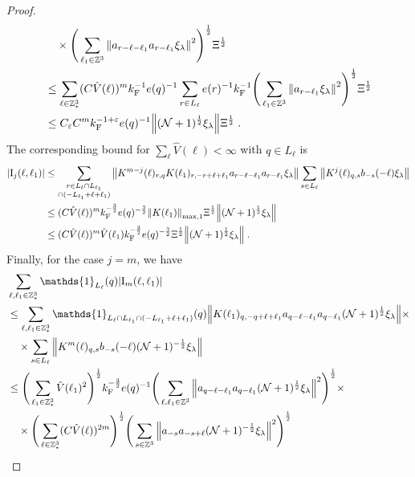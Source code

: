 \documentclass[12pt,a4paper]{article}
\numberwithin{equation}{section}
\newcommand{\1}{\mathbb{I}}
\newcommand{\F}{\mathrm{F}}
\newcommand{\I}{\mathrm{I}}
\newcommand{\Z}{\mathbb{Z}}
\newcommand{\NN}{\mathcal{N}}
\newcommand{\half}{\frac{1}{2}}
\theoremstyle{plain}
\theoremstyle{definition}
\theoremstyle{remark}
\theoremstyle{plain}
\theoremstyle{definition}
\theoremstyle{remark}
\begin{document}
\begin{proof}
\begin{align}
	&\quad \times \Bigg( \sum_{\ell_1 \in \Z^3} \norm{ a_{r-\ell-\ell_1} a_{r-\ell_1} \xi_\lambda}^2 \Bigg)^{\half}
		\Xi^\half \nonumber\\
	&\leq \sum_{\ell \in \Z^3_*} (C \hat{V}(\ell))^m k_{\F}^{-1} e(q)^{-1}
		\sum_{r \in L_\ell} e(r)^{-1} k_{\F}^{-1}
		\Bigg( \sum_{\ell_1 \in \Z^3} \norm{ a_{r-\ell_1} \xi_\lambda}^2 \Bigg)^{\half}
		\Xi^\half \nonumber\\
	&\leq C_\varepsilon C^m k_{\F}^{-1+\varepsilon} e(q)^{-1}
		\norm{ (\NN+1)^{\half} \xi_\lambda}
		\Xi^\half \;. \label{eq:estEQ2152_Coulomb}
\end{align}
The corresponding bound for $ \sum_\ell \hat{V}(\ell) < \infty $ with $ q \in L_\ell $ is
\begin{align}
	|\I_j(\ell, \ell_1)|
	&\leq \sum_{\substack{r\in L_{\ell} \cap L_{\ell_1}\\ \cap (-L_{\ell_1}+\ell+\ell_1)}}
		\norm{ K^{m-j}(\ell)_{r,q} K(\ell_1)_{r,-r+\ell+\ell_1} a_{r-\ell-\ell_1} a_{r-\ell_1} \xi_\lambda}
		\sum_{s \in L_{\ell}}
		\norm{ K^j(\ell)_{q,s} b_{-s}(-\ell) \xi_\lambda }\nonumber\\
	&\leq (C \hat{V}(\ell))^m k_{\F}^{-\frac 32} e(q)^{-\frac 32}
		\norm{K(\ell_1)}_{\max,1} \Xi^{\half}
		\norm{ (\NN+1)^\half \xi_\lambda} \nonumber\\
	&\leq (C \hat{V}(\ell))^m
		\hat{V}(\ell_1)
		k_{\F}^{-\frac 32} e(q)^{-\frac 32} \Xi^\half
		\norm{ (\NN+1)^\half \xi_\lambda} \;. \label{eq:estEQ2152}
\end{align}
Finally, for the case $ j = m $, we have
\begin{align}
	&\sum_{\ell,\ell_1 \in \Z^3_*} \mathds{1}_{L_\ell}(q) |\I_m(\ell, \ell_1)| \nonumber\\
	&\leq \sum_{\ell,\ell_1 \in \Z^3_*} \mathds{1}_{L_\ell \cap L_{\ell_1} \cap (-L_{\ell_1} + \ell + \ell_1)}(q) \norm{K(\ell_1)_{q,-q+\ell+\ell_1} a_{q-\ell-\ell_1} a_{q-\ell_1} (\NN+1)^{\half} \xi_\lambda} \times \nonumber\\
	&\quad \times \sum\limits_{ s \in L_{\ell}}
		\norm{ K^m(\ell)_{q,s} b_{-s}(-\ell) (\NN+1)^{-\half} \xi_\lambda }\nonumber\\
	&\leq \Bigg( \sum_{\ell_1 \in \Z^3_*} \hat{V}(\ell_1)^2 \Bigg)^{\half} 
		k_{\F}^{-\frac 32} e(q)^{-1}
		\Bigg( \sum_{\ell,\ell_1 \in \Z^3} \norm{a_{q-\ell-\ell_1} a_{q-\ell_1} (\NN+1)^{\half} \xi_\lambda}^2 \Bigg)^{\half} \times \nonumber\\
	&\quad \times \Bigg( \sum_{\ell \in \Z^3_*} (C \hat{V}(\ell))^{2m} \Bigg)^{\half} 
		\Bigg( \sum\limits_{ s \in \Z^3} \norm{ a_{-s} a_{-s+\ell} (\NN+1)^{-\half} \xi_\lambda }^2 \Bigg)^{\half} \nonumber\\

\end{align}
\end{proof}
\end{document}

